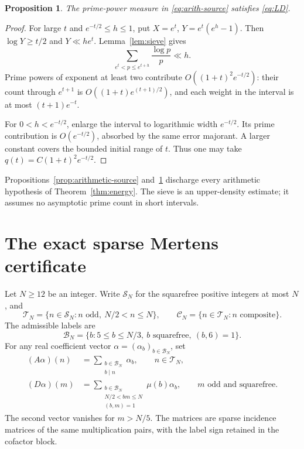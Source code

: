 \documentclass[11pt,letterpaper]{article}
\numberwithin{equation}{section}
\newtheorem{proposition}[theorem]{Proposition}
\theoremstyle{definition}
\theoremstyle{remark}
\newcommand{\N}{\mathbb N}
\begin{document}
\begin{proposition}\label{prop:LD-arithmetic}
The prime-power measure in \eqref{eq:arith-source} satisfies
\eqref{eq:LD}.
\end{proposition}
\begin{proof}
For large $t$ and $e^{-t/2}\le h\le1$, put
$X=e^t$, $Y=e^t(e^h-1)$. Then $\log Y\ge t/2$ and $Y\ll he^t$.
Lemma~\ref{lem:sieve} gives
\[
 \sum_{e^t<p\le e^{t+h}}\frac{\log p}{p}\ll h.
\]
Prime powers of exponent at least two contribute
$O((1+t)^2e^{-t/2})$: their count through $e^{t+1}$ is
$O((1+t)e^{(t+1)/2})$, and each weight in the interval is at most
$(t+1)e^{-t}$.

For $0<h<e^{-t/2}$, enlarge the interval to logarithmic width $e^{-t/2}$.
Its prime contribution is $O(e^{-t/2})$, absorbed by the same error
majorant. A larger constant covers the bounded initial range of $t$.
Thus one may take $q(t)=C(1+t)^2e^{-t/2}$.
\end{proof}

Propositions~\ref{prop:arithmetic-source} and~\ref{prop:LD-arithmetic}
discharge every arithmetic hypothesis of Theorem~\ref{thm:energy}.
The sieve is an upper-density estimate; it assumes no asymptotic prime
count in short intervals.

\section{The exact sparse Mertens certificate}\label{sec:certificate}

Let $N\ge12$ be an integer. Write $\mathcal S_N$ for the squarefree
positive integers at most $N$, and
\[
 \mathcal T_N=\{n\in\mathcal S_N:n\text{ odd},\ N/2<n\le N\},\qquad
 \mathcal C_N=\{n\in\mathcal T_N:n\text{ composite}\}.
\]
The admissible labels are
\[
 \mathcal B_N=\{b:5\le b\le N/3,\ b\text{ squarefree},\ (b,6)=1\}.
\]
For any real coefficient vector $\alpha=(\alpha_b)_{b\in\mathcal B_N}$, set
\begin{align}
 (A\alpha)(n)&=\sum_{\substack{b\in\mathcal B_N\\b\mid n}}\alpha_b,
        \qquad n\in\mathcal T_N,\label{eq:A}\\
 (D\alpha)(m)&=\sum_{\substack{b\in\mathcal B_N\\N/2<bm\le N\\(b,m)=1}}
                       \mu(b)\alpha_b,
        \qquad m\text{ odd and squarefree}.\label{eq:D}
\end{align}
The second vector vanishes for $m>N/5$. The matrices are sparse incidence
matrices of the same multiplication pairs, with the label sign retained
in the cofactor block.
\end{document}
